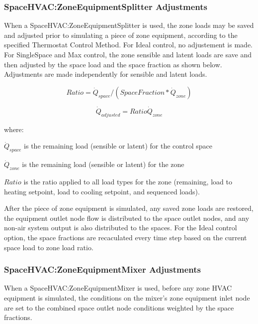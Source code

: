 \subsubsection{SpaceHVAC:ZoneEquipmentSplitter Adjustments}\label{space-hvac-zoneeqsplitter-adjustments}
When a SpaceHVAC:ZoneEquipmentSplitter is used, the zone loads may be saved and adjusted prior to simulating a piece of zone equipment, according to the specified Thermostat Control Method. For Ideal control, no adjustement is made. For SingleSpace and Max control, the zone sensible and latent loads are save and then adjusted by the space load and the space fraction as shown below. Adjustments are made independently for sensible and latent loads.

\begin{equation}
{Ratio} = \dot Q_{space} / (SpaceFraction * {\dot Q_{zone}})
\label{eq:SpaceHVACLoadAdjustment1}
\end{equation}

\begin{equation}
{\dot Q_{adjusted}} = {Ratio}{\dot Q_{zone}} 
\label{eq:SpaceHVACLoadAdjustment2}
\end{equation}

where:

${\dot Q_{space}}$ is the remaining load (sensible or latent) for the control space

${\dot Q_{zone}}$ is the remaining load (sensible or latent) for the zone

$Ratio$ is the ratio applied to all load types for the zone (remaining, load to heating setpoint, load to cooling setpoint, and sequenced loads). 

After the piece of zone equipment is simulated, any saved zone loads are restored, the equipment outlet node flow is distributed to the space outlet nodes, and any non-air system output is also distributed to the spaces. For the Ideal control option, the space fractions are recaculated every time step based on the current space load to zone load ratio.

\subsubsection{SpaceHVAC:ZoneEquipmentMixer Adjustments}\label{space-hvac-zoneeqmixer-adjustments}
When a SpaceHVAC:ZoneEquipmentMixer is used, before any zone HVAC equipment is simulated, the conditions on the mixer's zone equipment inlet node are set to the combined space outlet node conditions weighted by the space fractions.

